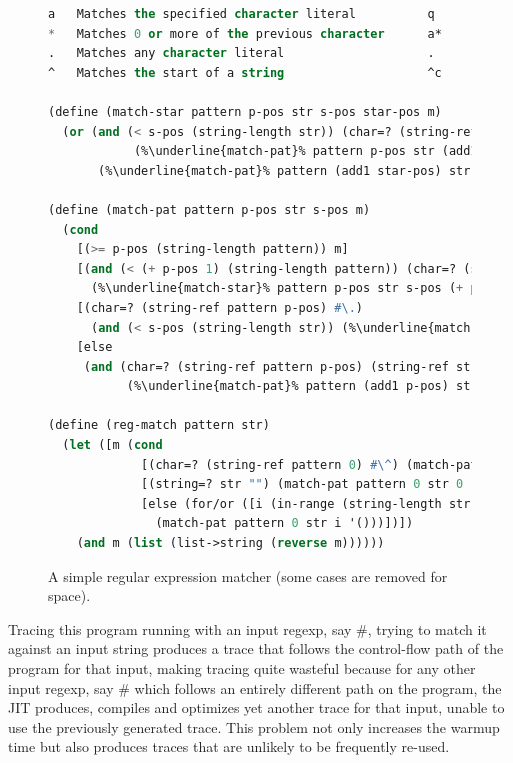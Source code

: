 \begin{figure}[h!]
  \footnotesize
  \begin{mdframed}
\begin{lstlisting}[mathescape,escapechar=\%,language=lisp]
a 	Matches the specified character literal          q       q
* 	Matches 0 or more of the previous character      a*      "", a, aa, aaa
. 	Matches any character literal                    .       a, b, c, d, e ...
^ 	Matches the start of a string                    ^c      c, ca, caa, cbb ...

(define (match-star pattern p-pos str s-pos star-pos m)
  (or (and (< s-pos (string-length str)) (char=? (string-ref pattern p-pos) (string-ref str s-pos))
            (%\underline{match-pat}% pattern p-pos str (add1 s-pos) (cons (string-ref str s-pos) m)))
       (%\underline{match-pat}% pattern (add1 star-pos) str s-pos m)))

(define (match-pat pattern p-pos str s-pos m)
  (cond
    [(>= p-pos (string-length pattern)) m]
    [(and (< (+ p-pos 1) (string-length pattern)) (char=? (string-ref pattern (+ p-pos 1)) #\*))
      (%\underline{match-star}% pattern p-pos str s-pos (+ p-pos 1) m)]
    [(char=? (string-ref pattern p-pos) #\.)
      (and (< s-pos (string-length str)) (%\underline{match-pat}% pattern (add1 p-pos) str (add1 s-pos) (cons (string-ref str s-pos) m)))]
    [else
     (and (char=? (string-ref pattern p-pos) (string-ref str s-pos))
           (%\underline{match-pat}% pattern (add1 p-pos) str (add1 s-pos) (cons (string-ref str s-pos) m)))]))

(define (reg-match pattern str)
  (let ([m (cond
             [(char=? (string-ref pattern 0) #\^) (match-pat pattern 1 str 0 '())]
             [(string=? str "") (match-pat pattern 0 str 0 '())] ; edge case
             [else (for/or ([i (in-range (string-length str))])
               (match-pat pattern 0 str i '()))])])
    (and m (list (list->string (reverse m))))))
\end{lstlisting}
\end{mdframed}
\caption{A simple regular expression matcher (some cases are removed for space).}
\label{fig:regexp}
\end{figure}

Tracing this program running with an input regexp, say
$\mathtt{\#}$, trying to match it against an
input string produces a trace that follows the control-flow path of
the program for that input, making tracing quite wasteful because for
any other input regexp, say $\mathtt{\#}$ which
follows an entirely different path on the program, the JIT produces,
compiles and optimizes yet another trace for that input, unable to use
the previously generated trace. This problem not only increases the
warmup time but also produces traces that are unlikely to be
frequently re-used.

